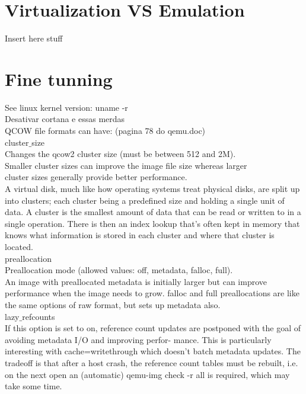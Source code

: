 \documentclass[11pt, a4paper, oneside]{article}
\theoremstyle{definition}
\begin{document}
\vfill
\pagebreak
\section{Virtualization VS Emulation}

Insert here stuff


\vfill
\pagebreak
\section{Fine tunning}

See linux kernel version: uname -r\\
Desativar cortana e essas merdas\\

QCOW file formats can have: (pagina 78 do qemu.doc)\\
cluster$\_$size\\
Changes the qcow2 cluster size (must be between 512 and 2M).\\
Smaller cluster sizes can improve the image file size whereas larger\\
cluster sizes generally provide better performance.\\

A virtual disk, much like how operating systems treat physical disks, are split up into clusters; each cluster being a predefined size and holding a single unit of data. A cluster is the smallest amount of data that can be read or written to in a single operation. There is then an index lookup that’s often kept in memory that knows what information is stored in each cluster and where that cluster is located.\\

preallocation\\
Preallocation mode (allowed values: off, metadata, falloc, full).\\
An image with preallocated metadata is initially larger but can
improve performance when the image needs to grow. falloc and
full preallocations are like the same options of raw format, but
sets up metadata also.\\

lazy$\_$refcounts\\
If this option is set to on, reference count updates are postponed
with the goal of avoiding metadata I/O and improving perfor-
mance. This is particularly interesting with cache=writethrough
which doesn’t batch metadata updates. The tradeoff is that after
a host crash, the reference count tables must be rebuilt, i.e. on
the next open an (automatic) qemu-img check -r all is required,
which may take some time.\\
\end{document}
